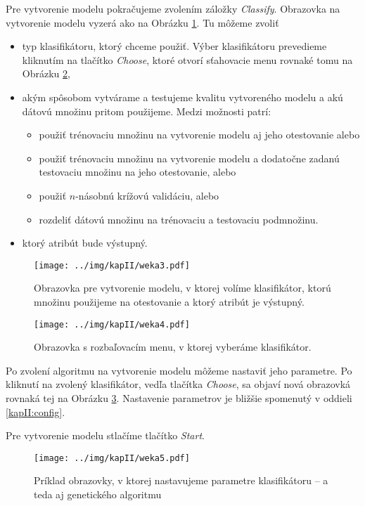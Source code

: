 Pre vytvorenie modelu pokračujeme zvolením záložky \emph{Classify}. Obrazovka na vytvorenie modelu vyzerá ako na Obrázku \ref{fig:gui3}. Tu môžeme zvoliť 
\begin{itemize}
\item typ klasifikátoru, ktorý chceme použiť. Výber klasifikátoru prevedieme kliknutím na tlačítko \emph{Choose}, ktoré otvorí sťahovacie menu rovnaké tomu na Obrázku \ref{fig:gui4},
\item akým spôsobom vytvárame a testujeme kvalitu vytvoreného modelu a akú dátovú množinu pritom použijeme. Medzi možnosti patrí:
\begin{itemize}
\item použiť trénovaciu množinu na vytvorenie modelu aj jeho otestovanie alebo
\item použiť trénovaciu množinu na vytvorenie modelu a dodatočne zadanú testovaciu množinu na jeho otestovanie, alebo
\item použiť $n$-násobnú krížovú validáciu, alebo
\item rozdeliť dátovú množinu na trénovaciu a testovaciu podmnožinu.
\end{itemize}
\item ktorý atribút bude výstupný.
\end{itemize}  

\begin{figure}[h!]
\centering
\centerline{\mbox{\texttt{[image: ../img/kapII/weka3.pdf]}}}
\caption{Obrazovka pre vytvorenie modelu, v ktorej volíme klasifikátor, ktorú množinu použijeme na otestovanie a ktorý atribút je výstupný.}\label{fig:gui3}
\end{figure}

\begin{figure}[h!]
\centering
\centerline{\mbox{\texttt{[image: ../img/kapII/weka4.pdf]}}}
\caption{Obrazovka s rozbaľovacím menu, v ktorej vyberáme klasifikátor.}\label{fig:gui4}
\end{figure}

Po zvolení algoritmu na vytvorenie modelu môžeme nastaviť jeho parametre. Po kliknutí na zvolený klasifikátor, vedľa tlačítka \emph{Choose}, sa objaví nová obrazovká rovnaká tej na Obrázku \ref{fig:gui5}. Nastavenie parametrov je bližšie spomenutý v oddieli \ref{kapII:config}.

Pre vytvorenie modelu stlačíme tlačítko \emph{Start}.

\begin{figure}[h!]
\centering
\centerline{\mbox{\texttt{[image: ../img/kapII/weka5.pdf]}}}
\caption{Príklad obrazovky, v ktorej nastavujeme parametre klasifikátoru -- a teda aj genetického algoritmu}\label{fig:gui5}
\end{figure}

